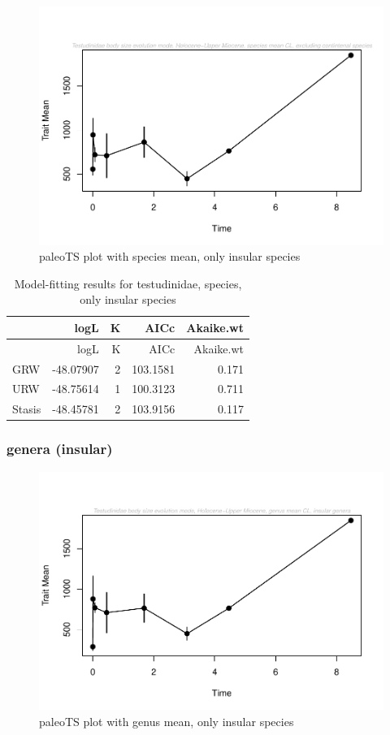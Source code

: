 \documentclass[]{article}
\begin{document}
\begin{figure}[htbp]
\centering
\includegraphics{MA_JJ_files/figure-latex/paleoTS plot with species mean, excluding continental species-1.pdf}
\caption{paleoTS plot with species mean, only insular species}
\end{figure}

\begin{longtable}[]{@{}lrrrr@{}}
\caption{Model-fitting results for testudinidae, species, only insular
species}\tabularnewline
\toprule
& logL & K & AICc & Akaike.wt\tabularnewline
\midrule
\endfirsthead
\toprule
& logL & K & AICc & Akaike.wt\tabularnewline
\midrule
\endhead
GRW & -48.07907 & 2 & 103.1581 & 0.171\tabularnewline
URW & -48.75614 & 1 & 100.3123 & 0.711\tabularnewline
Stasis & -48.45781 & 2 & 103.9156 & 0.117\tabularnewline
\bottomrule
\end{longtable}

\newpage

\subsubsection{genera (insular)}\label{genera-insular}

\begin{figure}[htbp]
\centering
\includegraphics{MA_JJ_files/figure-latex/paleoTS plot with genus mean, excluding continental species-1.pdf}
\caption{paleoTS plot with genus mean, only insular species}
\end{figure}
\end{document}
